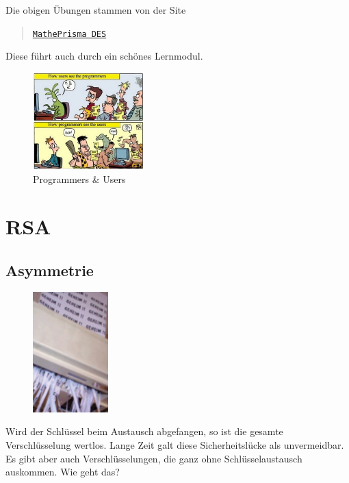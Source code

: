 \documentclass[%
11pt,%
twoside,%
titlepage,%
german,%
headsepline%
]{scrartcl}
\begin{document}
Die obigen Übungen stammen von der Site
\begin{quote}
    \href{http://www.matheprisma.uni-wuppertal.de/Module/DES/index.htm}{\texttt{MathePrisma DES}}
\end{quote}
Diese führt auch durch ein schönes Lernmodul.

\begin{figure}
\begin{center}
\includegraphics[width=0.382\textwidth]{pictures/users}
\end{center}
\caption{Programmers \& Users}
\end{figure}

\clearpage

\section{RSA}
\subsection{Asymmetrie}

\begin{figure}
\vspace{-22pt}
  \begin{center}
    \includegraphics[width=0.26\textwidth]{pictures/rsa}
  \end{center}
\vspace{-22pt}
\end{figure}
Wird der Schlüssel beim Austausch abgefangen, so ist die gesamte Verschlüsselung wertlos. Lange Zeit galt diese Sicherheitslücke als unvermeidbar. Es gibt aber auch Verschlüsselungen, die ganz ohne Schlüsselaustausch auskommen. Wie geht das?
\end{document}
